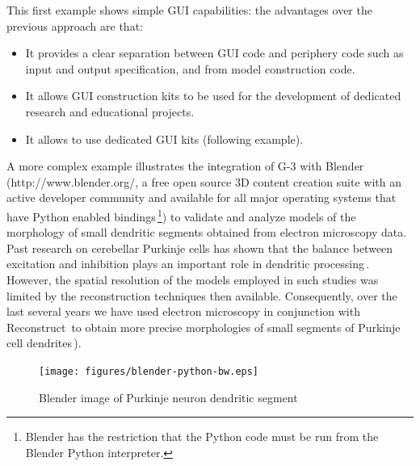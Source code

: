 \documentclass[12pt]{article}
\begin{document}
This first example shows simple GUI capabilities: the advantages over
the previous approach are that:
\begin{itemize}
\item It provides a clear separation between GUI code and periphery
  code such as input and output specification, and from model
  construction code.
\item It allows GUI construction kits to be used for the development
  of dedicated research and educational projects.
\item It allows to use dedicated GUI kits (following example).
\end{itemize}

A more complex example illustrates the integration of G-3 with Blender
(http://www.blender.org/, a free open source 3D content creation suite
with an active developer community and available for all major
operating systems that have Python enabled bindings\,\footnote{Blender
  has the restriction that the Python code must be run from the
  Blender Python interpreter.}) to validate and analyze models of the
morphology of small dendritic segments obtained from electron
microscopy data. Past research on cerebellar Purkinje cells has shown
that the balance between excitation and inhibition plays an important
role in dendritic processing\,\cite{santamaria02:_modul_purkin,
  mittmann07:_linkin_purkin}.  However, the spatial resolution of the
models employed in such studies was limited by the reconstruction
techniques then available.  Consequently, over the last several years
we have used electron microscopy in conjunction with
Reconstruct\,\cite{jc05:_recon}
to obtain more precise morphologies of small segments of Purkinje cell
dendrites\,\cite{lu09:_d_purkin, cornelis08:_model_neuros_genes}).

\begin{figure}[ht]
  \centering
    \texttt{[image: figures/blender-python-bw.eps]}
  \caption{Blender image of Purkinje neuron dendritic segment}
  \label{fig:cbi-blender}
\end{figure}

\end{document}

